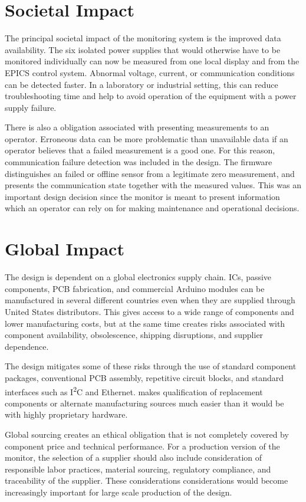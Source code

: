 \section{Societal Impact}

The principal societal impact of the monitoring system is the improved data availability. The six isolated power supplies that would otherwise have to be monitored individually can now be measured from one local display and from the EPICS
control system. Abnormal voltage, current, or communication conditions can be detected faster. In a laboratory or industrial setting, this can reduce troubleshooting time and help to avoid operation of the equipment with a power supply failure.

There is also a obligation associated with presenting measurements to an
operator. Erroneous data can be more problematic than unavailable data if an operator
believes that a failed measurement is a good one. For this reason, communication failure
detection was included in the design. The firmware distinguishes an failed or
offline sensor from a legitimate zero measurement, and presents the communication state together with the measured values. This was an important design decision
since the monitor is meant to present information which an operator can rely on for making maintenance and operational decisions.

\section{Global Impact}

The design is dependent on a global electronics supply chain. ICs, passive components, PCB fabrication, and commercial Arduino modules can be manufactured in several different countries even when they are supplied through United States distributors. This gives access to a wide range of
components and lower manufacturing costs, but at the same time creates risks associated with component availability, obsolescence, shipping disruptions, and
supplier dependence.

The design mitigates some of these risks through the use of standard component
packages, conventional PCB assembly, repetitive circuit blocks, and standard interfaces such as I\textsuperscript{2}C and Ethernet. makes qualification of replacement components or alternate manufacturing sources much easier than it would be with highly proprietary hardware.

Global sourcing creates an ethical obligation that is not completely covered by component price and technical performance. For a production version of the monitor, the selection of a supplier should also include consideration of responsible labor practices, material sourcing, regulatory compliance, and traceability of the supplier. These considerations considerations would become increasingly important for large scale production of the design.

